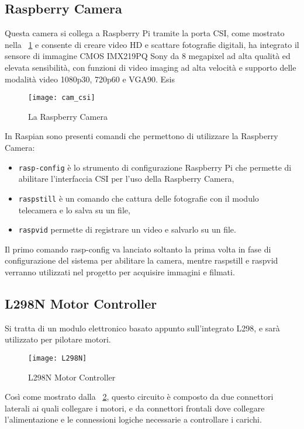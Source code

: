 \subsection{Raspberry Camera}
Questa camera si collega a Raspberry Pi tramite la porta CSI, come mostrato nella \figurename~\ref{fig:camera} e consente di creare video HD e scattare fotografie digitali, ha integrato il sensore di immagine CMOS IMX219PQ Sony da 8 megapixel ad alta qualità ed elevata sensibilità, con funzioni di video imaging ad alta velocità e supporto delle modalità video 1080p30, 720p60 e VGA90.
Esis
\begin{figure}[htbp!] 
	\centering    
	\texttt{[image: cam\_csi]}
	\caption[Raspberry Camera]{La Raspberry Camera}
	\label{fig:camera}
\end{figure}
In Raspian sono presenti comandi che permettono di utilizzare la Raspberry Camera:
\begin{itemize}
	\item \texttt{rasp-config} è lo strumento di configurazione  Raspberry Pi che permette di abilitare l'interfaccia CSI per l'uso della Raspberry Camera,
	\item \texttt{raspstill} è un comando che cattura delle fotografie con il modulo telecamera e lo salva su un file,
	\item \texttt{raspvid} permette di registrare un video e salvarlo su un file.
\end{itemize}
Il primo comando rasp-config va lanciato soltanto la prima volta in fase di configurazione del sistema per abilitare la camera, mentre raspstill e raspvid verranno utilizzati nel progetto per acquisire immagini e filmati.

\subsection{L298N Motor Controller}
Si tratta di un modulo elettronico basato appunto sull’integrato L298, e sarà utilizzato per pilotare motori.

\begin{figure}[htbp!] 
	\centering    
	\texttt{[image: L298N]}
	\caption[L298N Motor Controller]{L298N Motor Controller}
	\label{fig:L298N}
\end{figure}
Così come mostrato dalla \figurename~\ref{fig:L298N}, questo circuito è composto da due connettori laterali ai quali collegare i motori, e da connettori frontali dove collegare l’alimentazione e le connessioni logiche necessarie a controllare i carichi.

